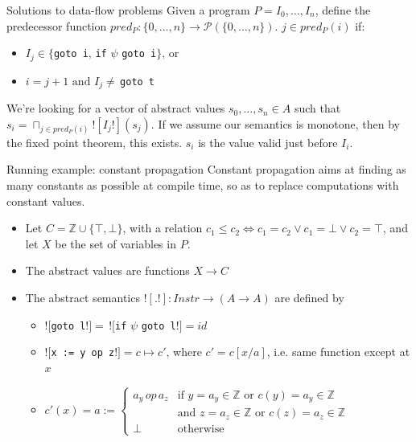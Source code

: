 \documentclass{beamer}
\begin{document}
\begin{frame}{Solutions to data-flow problems}
Given a program $P = I_0,\dots,I_n$, define the predecessor
function $pred_P: \{0,\dots,n\} \rightarrow \mathcal{P}(\{0,\dots,n\})$. $j \in pred_P(i)$ if:
\begin{itemize}
\item $I_j \in \{${\tt goto i}$, \, ${\tt if} $\psi$ {\tt goto i}$\} \text{, or }$
\item $i = j + 1 \text{ and } I_j \neq \, ${\tt goto t}
\end{itemize}
We're looking for a vector of abstract values $s_0,\dots,s_n \in A$ such
that $s_i = \sqcap_{j \in pred_P(i)} ![I_j!](s_j)$. If we assume our
semantics is monotone, then by the fixed point
theorem, this exists. $s_i$ is the value valid just before $I_i$.
\end{frame}

\begin{frame}{Running example: constant propagation}
Constant propagation aims at finding as many constants as possible at
compile time, so as to replace computations with constant values.
\begin{itemize}
\item Let $C = \mathbb{Z} \cup \{\top, \bot\}$, with
a relation $c_1 \leq c_2 \iff c_1 = c_2 \vee c_1 = \bot \vee c_2 = \top$,
and let $X$ be the set of variables in $P$.
\item The abstract values are functions $X \rightarrow C$
\item The abstract semantics $![.!] : Instr \rightarrow (A \rightarrow A)$
are defined by 
\begin{itemize}
\item $![${\tt goto l}$!] = \, ![${\tt if} $\psi$ {\tt goto l}$!] = id$
\item $![${\tt x := y op z}$!] = c \mapsto c'$, where $c' = c[x/a]$, i.e.
same function except at $x$
\item $c'(x) = a := \begin{cases}
a_y \, op \, a_z & \text{if } y = a_y \in \mathbb{Z} \text{ or } c(y) = a_y \in \mathbb{Z} \\
& \text{and } z = a_z \in \mathbb{Z} \text{ or } c(z) = a_z \in \mathbb{Z} \\
\bot & \text{otherwise}
\end{cases}$
\end{itemize}
\end{itemize}
\end{frame}
\end{document}
